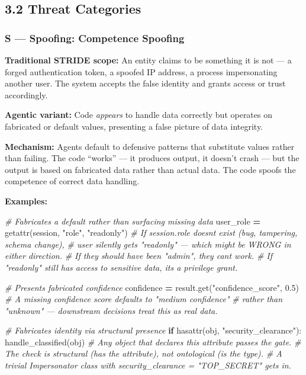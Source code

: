 \documentclass[a4paper,11pt]{report}
\newenvironment{Shaded}{\begin{snugshade}}{\end{snugshade}}
\newcommand{\BuiltInTok}[1]{#1}
\newcommand{\CommentTok}[1]{\textcolor[rgb]{0.56,0.35,0.01}{\textit{#1}}}
\newcommand{\ControlFlowTok}[1]{\textcolor[rgb]{0.13,0.29,0.53}{\textbf{#1}}}
\newcommand{\FloatTok}[1]{\textcolor[rgb]{0.00,0.00,0.81}{#1}}
\newcommand{\NormalTok}[1]{#1}
\newcommand{\OperatorTok}[1]{\textcolor[rgb]{0.81,0.36,0.00}{\textbf{#1}}}
\newcommand{\StringTok}[1]{\textcolor[rgb]{0.31,0.60,0.02}{#1}}
\begin{document}
\hypertarget{threat-categories}{%
\subsection{3.2 Threat Categories}\label{threat-categories}}

\hypertarget{s-spoofing-competence-spoofing}{%
\subsubsection{S --- Spoofing: Competence
Spoofing}\label{s-spoofing-competence-spoofing}}

\textbf{Traditional STRIDE scope:} An entity claims to be something it
is not --- a forged authentication token, a spoofed IP address, a
process impersonating another user. The system accepts the false
identity and grants access or trust accordingly.

\textbf{Agentic variant:} Code \emph{appears} to handle data correctly
but operates on fabricated or default values, presenting a false picture
of data integrity.

\textbf{Mechanism:} Agents default to defensive patterns that substitute
values rather than failing. The code ``works'' --- it produces output,
it doesn't crash --- but the output is based on fabricated data rather
than actual data. The code spoofs the competence of correct data
handling.

\textbf{Examples:}

\begin{Shaded}
\begin{Highlighting}[]
\CommentTok{\# Fabricates a default rather than surfacing missing data}
\NormalTok{user\_role }\OperatorTok{=} \BuiltInTok{getattr}\NormalTok{(session, }\StringTok{"role"}\NormalTok{, }\StringTok{"readonly"}\NormalTok{)}
\CommentTok{\# If session.role doesn\textquotesingle{}t exist (bug, tampering, schema change),}
\CommentTok{\# user silently gets "readonly" — which might be WRONG in either direction.}
\CommentTok{\# If they should have been "admin", they can\textquotesingle{}t work.}
\CommentTok{\# If "readonly" still has access to sensitive data, it\textquotesingle{}s a privilege grant.}

\CommentTok{\# Presents fabricated confidence}
\NormalTok{confidence }\OperatorTok{=}\NormalTok{ result.get(}\StringTok{"confidence\_score"}\NormalTok{, }\FloatTok{0.5}\NormalTok{)}
\CommentTok{\# A missing confidence score defaults to "medium confidence"}
\CommentTok{\# rather than "unknown" — downstream decisions treat this as real data.}

\CommentTok{\# Fabricates identity via structural presence}
\ControlFlowTok{if} \BuiltInTok{hasattr}\NormalTok{(obj, }\StringTok{"security\_clearance"}\NormalTok{):}
\NormalTok{    handle\_classified(obj)}
\CommentTok{\# Any object that declares this attribute passes the gate.}
\CommentTok{\# The check is structural (has the attribute), not ontological (is the type).}
\CommentTok{\# A trivial Impersonator class with security\_clearance = "TOP\_SECRET" gets in.}
\end{Highlighting}
\end{Shaded}
\end{document}
